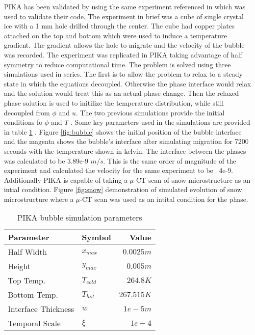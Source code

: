 \documentclass[twoside]{article}
\begin{document}
\begin{multicols}{2}
PIKA has been validated by using the same experiment referenced in \cite{Plapp_2009} which was used to validate their code. The experiment in brief was a cube of single crystal ice with a 1 mm hole drilled through the center. The cube had copper plates attached on the top and bottom which were used to induce a temperature gradient. The gradient allows the hole to migrate and the velocity of the bubble was recorded. The experiment was replicated in PIKA taking advantage of half symmetry to reduce computational time. The problem is solved using three simulations used in series. The first is to allow the problem to relax to a steady state in which the equations decoupled. Otherwise the phase interface would relax and the solution would treat this as an actual phase change. Then the relaxed phase solution is used to initilize the temperature distribution, while still decoupled from $\phi$ and $u$. The two previous simulations provide the initial conditions fo $\phi$ and $T$ . Some key parameters used in the simulations are provided in table \ref{table:bubble_stats} . Figure \ref{fig:bubble} shows the initial position of the bubble interface and the magenta shows the bubble's interface after simulating migration for 7200 seconds with the temperature shown in kelvin. The interface between the phases was calculated to be 3.89e-9 $m/s$. This is the same order of magnitude of the experiment and \cite{ref:Plapp_2009} calculated the velocity for the same experiment to be ~4e-9.
Additionally PIKA is capable of taking a $\mu$-CT scan of snow microstructure as an intial condition. Figure \ref{fig:snow} demonstration of simulated evolution of snow microstructure where a $\mu$-CT scan was used as an intital condition for the phase.

\begin{table}[H] 
\caption{PIKA bubble simulation parameters}
\label{table:bubble_stats}
\centering
\begin{tabular}{llr}
\toprule
Parameter & Symbol & Value \\
\midrule
Half Width & $x_{max}$ & $0.0025 m$ \\
Height & $y_{max}$ & $0.005 m$ \\
Top Temp. & $T_{cold}$ & $264.8 K$ \\
Bottom Temp. & $T_{hot}$ & $267.515 K$ \\
Interface Thickness & $w$ & $1e-5 m$ \\
Temporal Scale & $\xi$ & $1e-4$ \\
\bottomrule
\end{tabular}
\end{table}


\end{multicols}
\end{document}

